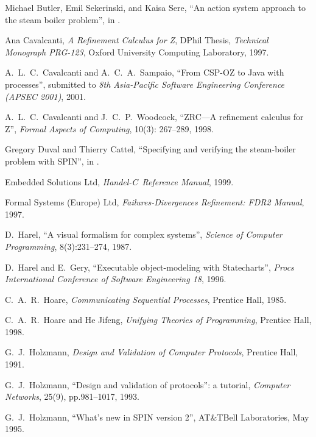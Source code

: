 \documentclass{report}
\newcommand{\HandelC}{\textsf{\slshape Handel-C}}
\begin{document}
\begin{thebibliography}{XX}
 Michael Butler, Emil Sekerinski,
  and Kaisa Sere, ``An action system approach to the steam boiler
  problem'', in \cite[pp.129--148]{abrial-borger-langmaack-96}.

 Ana Cavalcanti, \emph{A Refinement Calculus
    for Z}, DPhil Thesis, \emph{Technical Monograph PRG-123}, Oxford
    University Computing Laboratory, 1997.

 A.~L.~C.~Cavalcanti and
  A.~C.~A.~Sampaio, ``From CSP-OZ to Java with processes'', submitted
  to \emph{8th Asia-Pacific Software Engineering Conference (APSEC
    2001)}, 2001.

 A.~L.~C.~Cavalcanti and
  J.~C.~P.~Woodcock, ``ZRC---A refinement calculus for Z'',
  \textsl{Formal Aspects of Computing}, 10(3): 267--289, 1998.

 Gregory Duval and Thierry Cattel,
  ``Specifying and verifying the steam-boiler problem with SPIN'', in
  \cite[pp.203--217]{abrial-borger-langmaack-96}.

 Embedded Solutions Ltd,
  \emph{\HandelC\ Reference Manual}, 1999.

 Formal Systems (Europe) Ltd,
  \emph{Failures-Divergences Refinement: FDR2 Manual}, 1997.

 D.~Harel, ``A visual formalism for complex
  systems'', \emph{Science of Computer Programming}, 8(3):231--274,
  1987.

 D.~Harel and E.~Gery, ``Executable
  object-modeling with Statecharts'', \emph{Procs International
  Conference of Software Engineering 18}, 1996.

 C.~A.~R.~Hoare, \emph{Communicating Sequential
    Processes}, Prentice Hall, 1985.

 C.~A.~R.~Hoare and He Jifeng, \emph{Unifying
    Theories of Programming}, Prentice Hall, 1998.

 G.~J.~Holzmann, \emph{Design and Validation of
    Computer Protocols}, Prentice Hall, 1991.

 G.~J.~Holzmann, ``Design and validation of
  protocols'': a tutorial, \emph{Computer Networks}, 25(9),
  pp.981--1017, 1993.

 G.~J.~Holzmann, ``What's new in SPIN version
  2'', AT\&TBell Laboratories, May 1995.


\end{thebibliography}
\end{document}
